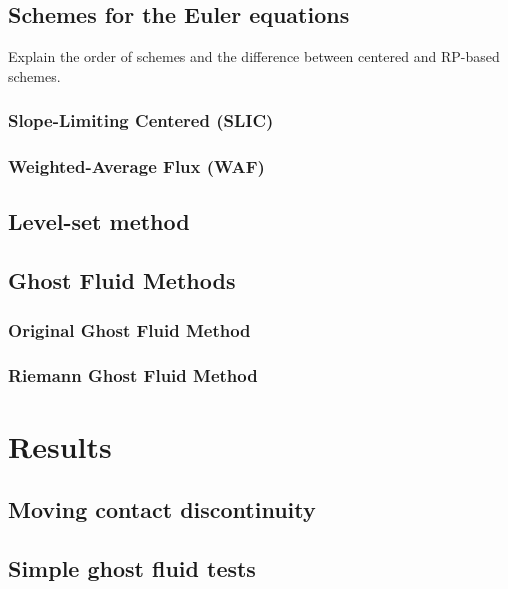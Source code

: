\documentclass[final,3p,twocolumn]{elsarticle}
\begin{document}
\subsection{Schemes for the Euler equations}
\label{subsec:eulerschemes}

Explain the order of schemes and the difference between centered and RP-based
schemes. 

\subsubsection{Slope-Limiting Centered (SLIC)}
\label{subsubsec:slic}

\subsubsection{Weighted-Average Flux (WAF)}
\label{subsubsec:waf}

\subsection{Level-set method}
\label{subsec:levelset}

\subsection{Ghost Fluid Methods}
\label{subsec:ghostfluid}

\subsubsection{Original Ghost Fluid Method}
\label{subsubsec:ogfm}

\subsubsection{Riemann Ghost Fluid Method}
\label{subsubsec:rgfm}

\section{Results}
\label{sec:results}

\subsection{Moving contact discontinuity}
\label{subsec:moving}

\subsection{Simple ghost fluid tests}
\label{subsec:toro}
\end{document}
